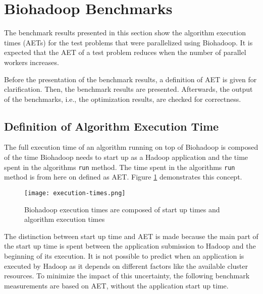 

\section{Biohadoop Benchmarks}
\label{chap:evaluation:benchmarks}
The benchmark results presented in this section show the algorithm execution times (AETs) for the test problems that were parallelized using Biohadoop. It is expected that the AET of a test problem reduces when the number of parallel workers increases.

Before the presentation of the benchmark results, a definition of AET is given for clarification. Then, the benchmark results are presented. Afterwards, the output of the benchmarks, i.e., the optimization results, are checked for correctness.

\subsection{Definition of Algorithm Execution Time}
\label{chap:evaluation:exec-definition}
The full execution time of an algorithm running on top of Biohadoop is composed of the time Biohadoop needs to start up as a Hadoop application and the time spent in the algorithms \texttt{run} method. The time spent in the algorithms \texttt{run} method is from here on defined as AET. Figure \ref{fig:execution-times} demonstrates this concept.

\begin{figure}
  \centering
  \texttt{[image: execution-times.png]}
  \caption[Division of Biohadoop execution times]{Biohadoop execution times are composed of start up times and algorithm execution times}
  \label{fig:execution-times}
\end{figure}

The distinction between start up time and AET is made because the main part of the start up time is spent between the application submission to Hadoop and the beginning of its execution. It is not possible to predict when an application is executed by Hadoop as it depends on different factors like the available cluster resources. To minimize the impact of this uncertainty, the following benchmark measurements are based on AET, without the application start up time.

